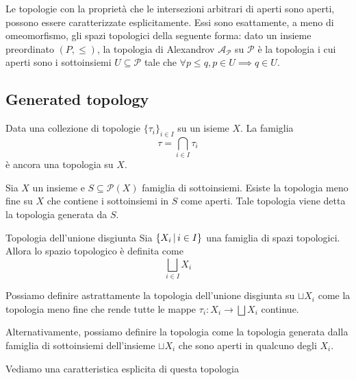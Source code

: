 \documentclass[a4paper]{article}
\begin{document}
\begin{snippetexercise}{}
    Le topologie con la proprietà che le intersezioni arbitrari di
    aperti sono aperti, possono essere
    caratterizzate esplicitamente.
    Essi sono esattamente, a meno di omeomorfismo,
    gli spazi topologici della seguente forma: dato un insieme preordinato \((P, \leq)\),
    la topologia di Alexandrov \(\mathcal{A}_{\mathcal{P}}\)
    su \(\mathcal{P}\) è la topologia i cui aperti sono i sottoinsiemi
    \(U \subseteq \mathcal{P}\) tale che
    \(\forall p \leq q, p \in U \implies q \in U\).
\end{snippetexercise}

\subsection{Generated topology}

\begin{snippetproposition}{}
    Data una collezione di topologie \(\{\tau_i\}_{i \in I}\)
    su un isieme \(X\). La famiglia
    \[
        \tau = \bigcap_{i\in I} \tau_i
    \]
    è ancora una topologia su \(X\).
\end{snippetproposition}

\begin{snippetcorollary}{}
    Sia \(X\) un insieme e \(S \subseteq \mathcal{P}(X)\) famiglia di sottoinsiemi.
    Esiste la topologia meno fine su \(X\) che contiene i sottoinsiemi in \(S\)
    come aperti.
    Tale topologia viene detta la topologia generata da \(S\).
\end{snippetcorollary}

\begin{snippetdefinition}{Topologia dell'unione disgiunta}
    Sia \(\{X_i \,|\, i \in I\}\) una famiglia di spazi topologici.
    Allora lo spazio topologico è definita come
    \[
        \bigsqcup_{i\in I} X_i
    \]

    Possiamo definire astrattamente la topologia dell'unione disgiunta su
    \(\sqcup X_i\) come la topologia meno fine che rende tutte le mappe \(\tau_i \colon X_i \to \bigsqcup X_i\)
    continue.

    Alternativamente, possiamo definire la topologia come la topologia generata dalla famiglia di sottoinsiemi
    dell'insieme \(\sqcup X_i\)
    che sono aperti in qualcuno degli \(X_i\).
\end{snippetdefinition}

Vediamo una caratteristica esplicita di questa topologia
\end{document}
